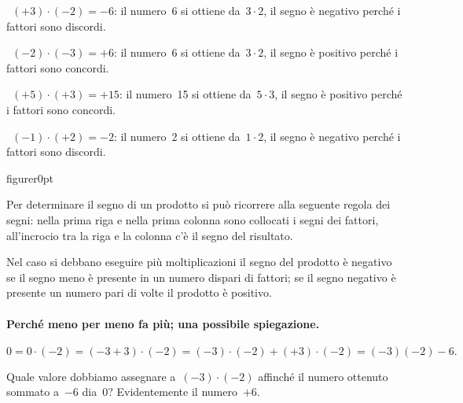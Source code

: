 \begin{exrig}
 \begin{esempio}
~\((+3)\cdot(-2)=-6\): il numero~6 si ottiene da~\(3\cdot2\), il segno è negativo 
perché i fattori sono discordi.
 \end{esempio}

 \begin{esempio}
~\((-2)\cdot(-3)=+6\): il numero~6 si ottiene da~\(3\cdot2\), il segno è positivo 
perché i fattori sono concordi.
 \end{esempio}
 \begin{esempio}
~\((+5)\cdot(+3)=+15\): il numero~15 si ottiene da~\(5\cdot3\), il segno è positivo 
perché i fattori sono concordi.
 \end{esempio}
 \begin{esempio}
~\((-1)\cdot(+2)=-2\): il numero~2 si ottiene da~\(1\cdot2\), il segno è negativo 
perché i fattori sono discordi.
 \end{esempio}

\end{exrig}

\begin{wrapfloat}{figure}{r}{0pt}

\end{wrapfloat}
Per determinare il segno di un prodotto si può ricorrere alla seguente regola 
dei segni: nella prima riga e
nella prima colonna sono collocati i segni dei fattori, all'incrocio tra la riga 
e la colonna c'è il segno
del risultato.

Nel caso si debbano eseguire più moltiplicazioni il segno del prodotto è 
negativo se il segno meno è presente
in un numero dispari di fattori; se il segno negativo è presente un numero pari 
di volte il prodotto è positivo.

\paragraph{Perché meno per meno fa più; una possibile spiegazione.}
\[0=0\cdot (-2) = (-3+3)\cdot (-2) = (-3)\cdot(-2)+(+3)\cdot(-2)=(-3)(-2)-6.\]

Quale valore dobbiamo assegnare a~\((-3)\cdot(-2)\) affinché il numero ottenuto 
sommato a~\(-6\) dia~0?
Evidentemente il numero~\(+6\).


